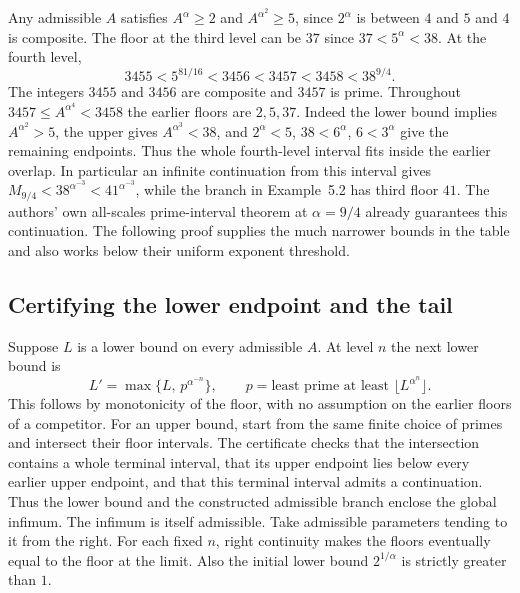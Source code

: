 Any admissible $A$ satisfies $A^\alpha\ge 2$ and $A^{\alpha^2}\ge5$, since $2^\alpha$ is between $4$ and $5$ and $4$ is composite. The floor at the third level can be $37$ since $37<5^\alpha<38$. At the fourth level,
\[
 3455<5^{81/16}<3456<3457<3458<38^{9/4}.
\]
The integers $3455$ and $3456$ are composite and $3457$ is prime. Throughout $3457\le A^{\alpha^4}<3458$ the earlier floors are $2,5,37$. Indeed the lower bound implies $A^{\alpha^2}>5$, the upper gives $A^{\alpha^3}<38$, and $2^\alpha<5$, $38<6^\alpha$, $6<3^\alpha$ give the remaining endpoints. Thus the whole fourth-level interval fits inside the earlier overlap. In particular an infinite continuation from this interval gives $M_{9/4}<38^{\alpha^{-3}}<41^{\alpha^{-3}}$, while the branch in Example~5.2 has third floor $41$. The authors' own all-scales prime-interval theorem at $\alpha=9/4$ already guarantees this continuation. The following proof supplies the much narrower bounds in the table and also works below their uniform exponent threshold.

\subsection{Certifying the lower endpoint and the tail}
Suppose $L$ is a lower bound on every admissible $A$. At level $n$ the next lower bound is
\[
 L' = \max\{L,\,p^{\alpha^{-n}}\},\qquad
 p=\text{least prime at least }\lfloor L^{\alpha^n}\rfloor .
\]
This follows by monotonicity of the floor, with no assumption on the earlier floors of a competitor. For an upper bound, start from the same finite choice of primes and intersect their floor intervals. The certificate checks that the intersection contains a whole terminal interval, that its upper endpoint lies below every earlier upper endpoint, and that this terminal interval admits a continuation. Thus the lower bound and the constructed admissible branch enclose the global infimum. The infimum is itself admissible. Take admissible parameters tending to it from the right. For each fixed $n$, right continuity makes the floors eventually equal to the floor at the limit. Also the initial lower bound $2^{1/\alpha}$ is strictly greater than $1$.

